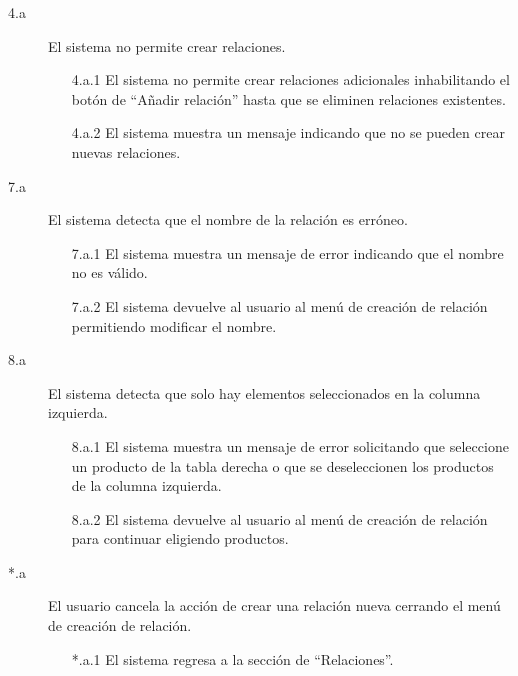 \begin{description}

    \item[4.a] El sistema no permite crear relaciones.
    \begin{enumerate}
        \item[4.a.1] El sistema no permite crear relaciones adicionales inhabilitando el botón de \enquote{Añadir relación} hasta que se eliminen relaciones existentes.
        \item[4.a.2] El sistema muestra un mensaje indicando que no se pueden crear nuevas relaciones. 
    \end{enumerate}
    
    \item[7.a] El sistema detecta que el nombre de la relación es erróneo.
    \begin{enumerate}
        \item[7.a.1] El sistema muestra un mensaje de error indicando que el nombre no es válido.
        \item[7.a.2] El sistema devuelve al usuario al menú de creación de relación permitiendo modificar el nombre.
    \end{enumerate}
    
    \item[8.a] El sistema detecta que solo hay elementos seleccionados en la columna izquierda.
    \begin{enumerate}
        \item[8.a.1] El sistema muestra un mensaje de error solicitando que seleccione un producto de la tabla derecha o que se deseleccionen los productos de la columna izquierda.
        \item[8.a.2] El sistema devuelve al usuario al menú de creación de relación para continuar eligiendo productos.
    \end{enumerate}

    \item[*.a] El usuario cancela la acción de crear una relación nueva cerrando el menú de creación de relación.
    \begin{enumerate}
        \item[*.a.1] El sistema regresa a la sección de \enquote{Relaciones}.
    \end{enumerate}
\end{description}

